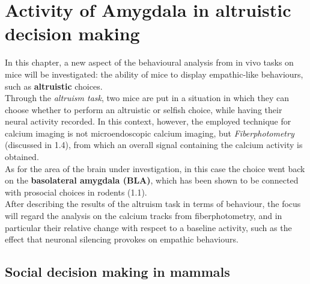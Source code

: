 \documentclass[a4paper]{article}
\begin{document}
	
	
\section{Activity of Amygdala in altruistic decision making}

In this chapter, a new aspect of the behavioural analysis from in vivo tasks on mice will be investigated: the ability of mice to display empathic-like behaviours, such as \textbf{altruistic} choices.\\
Through the \textit{altruism task}, two mice are put in a situation in which they can choose whether to perform an altruistic or selfish choice, while having their neural activity recorded. In this context, however, the employed technique for calcium imaging is not microendoscopic calcium imaging, but \textit{Fiberphotometry} (discussed in 1.4), from which an overall signal containing the calcium activity is obtained.\\
As for the area of the brain under investigation, in this case the choice went back on the \textbf{basolateral amygdala (BLA)}, which has been shown to be connected with prosocial choices in rodents (1.1).\\
After describing the results of the altruism task in terms of behaviour, the focus will regard the analysis on the calcium tracks from fiberphotometry, and in particular their relative change with respcet to a baseline activity, such as the effect that neuronal silencing provokes on empathic behaviours.


\subsection{Social decision making in mammals}
\end{document}
